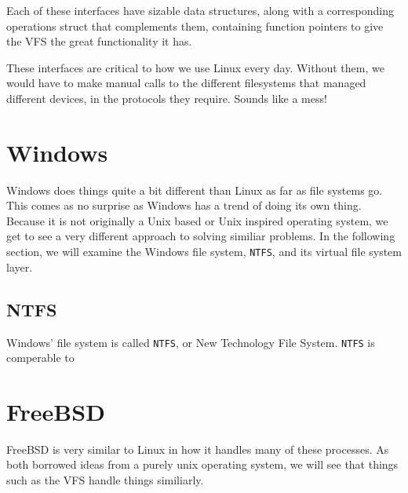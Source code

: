 \documentclass[10pt,letterpaper,onecolumn,draftclsnofoot]{IEEEtran}
\begin{document}
  Each of these interfaces have sizable data structures, along with a corresponding
  operations struct that complements them, containing function pointers to give the
  VFS the great functionality it has.\cite{robertlove2010}

  These interfaces are critical to how we use Linux every day. Without them, we
  would have to make manual calls to the different filesystems that managed different
  devices, in the protocols they require. Sounds like a mess!

\section{Windows}
Windows does things quite a bit different than Linux as far as file systems go.
This comes as no surprise as Windows has a trend of doing its own thing. Because
it is not originally a Unix based or Unix inspired operating system, we get to
see a very different approach to solving similiar problems. In the following
section, we will examine the Windows file system, \texttt{NTFS}, and its virtual
file system layer.
\subsection{NTFS}
  Windows' file system is called \texttt{NTFS}, or New Technology File System. 
  \texttt{NTFS} is
  comperable to 
  \cite{internals2}

\section{FreeBSD}
  FreeBSD is very similar to Linux in how it handles many of these processes. As
  both borrowed ideas from a purely unix operating system, we will see that things
  such as the VFS handle things similiarly.
\end{document}
